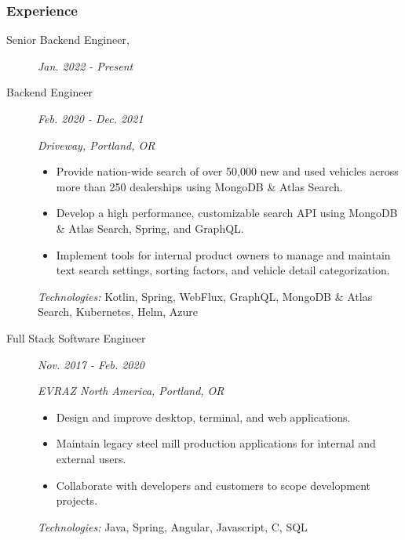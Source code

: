 \documentclass{article}
\begin{document}

\subsubsection*{Experience}

    \begin{description}
		
	\item[Senior Backend Engineer,] \hfill \textit{Jan. 2022 - Present}
	\item[Backend Engineer] \hfill \textit{Feb. 2020 - Dec. 2021}
		
        \textit{Driveway, Portland, OR}
        \begin{itemize}
        \item Provide nation-wide search of over 50,000 new and used vehicles across more than 250 dealerships using MongoDB \& Atlas Search.
        \item Develop a high performance, customizable search API using MongoDB \& Atlas Search, Spring, and GraphQL.
        \item Implement tools for internal product owners to manage and maintain text search settings, sorting factors, and vehicle detail categorization.
          
        \end{itemize}
        \textit{Technologies:} Kotlin, Spring, WebFlux, GraphQL, MongoDB \& Atlas Search, Kubernetes, Helm, Azure
		\vspace{0.5em}

	\item[Full Stack Software Engineer] \hfill \textit{Nov. 2017 - Feb. 2020}
		
        \textit{EVRAZ North America, Portland, OR}
        \begin{itemize}     
            \item Design and improve desktop, terminal, and web applications.
            \item Maintain legacy steel mill production applications for internal and external users.
            \item Collaborate with developers and customers to scope development projects.
        \end{itemize}
        \textit{Technologies:} Java, Spring, Angular, Javascript, C, SQL
        
    \end{description}
\end{document}

